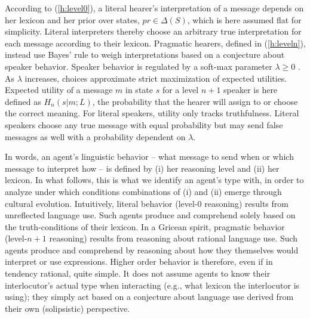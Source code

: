 \documentclass[a4paper, 11pt]{article}
\theoremstyle{Satz}
\newcommand{\state}{\ensuremath{s}\xspace}		%
\newcommand{\messg}{\ensuremath{m}\xspace}		%
\begin{document}
According to (\ref{h:level0}), a literal hearer's interpretation of a message depends on her
lexicon and her prior over states, $pr \in \Delta(S)$, which is here assumed flat for
simplicity. Literal interpreters thereby choose an arbitrary true interpretation for each
message according to their lexicon. Pragmatic hearers, defined in (\ref{h:leveln}), instead use Bayes' rule to weigh
interpretations based on a conjecture about speaker behavior. Speaker behavior is regulated by
a soft-max parameter $\lambda \geq 0$ \citep{luce:1959,sutton+barto:1998}. As
$\lambda$ increases, choices approximate strict maximization of expected utilities. Expected
utility of a message $\messg$ in state $\state$ for a level $n+1$ speaker is here defined as
$H_{n}(s|m;L)$, the probability that the hearer will assign to or choose the correct
meaning. For literal speakers, utility only tracks truthfulness. Literal speakers choose any
true message with equal probability but may send false messages as well with a probability
dependent on $\lambda$.

In words, an agent's linguistic behavior -- what message to send when or which message to
interpret how -- is defined by (i) her reasoning level and (ii) her lexicon. In what follows,
this is what we identify an agent's type with, in order to analyze under which conditions
combinations of (i) and (ii) emerge through cultural evolution. Intuitively, literal behavior
(level-$0$ reasoning) results from unreflected language use. Such agents produce and comprehend
solely based on the truth-conditions of their lexicon. In a Gricean spirit, pragmatic behavior
(level-$n+1$ reasoning) results from reasoning about rational language use. Such agents produce
and comprehend by reasoning about how they themselves would interpret or use
expressions. Higher order behavior is therefore, even if in tendency rational, quite simple. It
does not assume agents to know their interlocutor's actual type when interacting (e.g., what
lexicon the interlocutor is using); they simply act based on a conjecture about language use
derived from their own (solipsistic) perspective.
\end{document}
